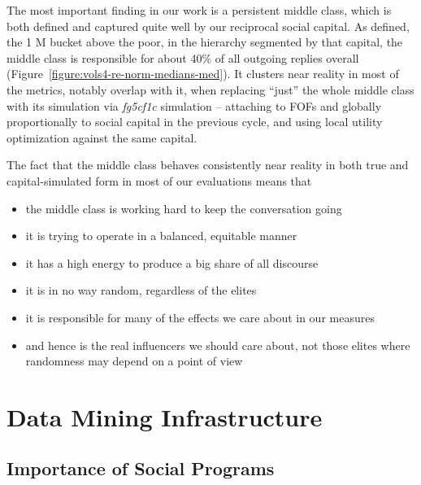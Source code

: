 \documentclass[10pt,oneside]{memoir}
\begin{document}
\begin{Spacing}{2}
The most important finding in our work is a persistent middle class, which is both defined and captured quite well by our reciprocal social capital.  As defined, the 1 M bucket above the poor, in the hierarchy segmented by that capital, the middle class is responsible for about 40\% of all outgoing replies overall (Figure~\ref{figure:vols4-re-norm-medians-med}).  It clusters near reality in most of the metrics, notably overlap with it, when replacing ``just'' the whole middle class with its simulation via {\itshape fg5cf1c} simulation -- attaching to FOFs and globally proportionally to social capital in the previous cycle, and using local utility optimization against the same capital.  


The fact that the middle class behaves consistently near reality in both true and capital-simulated form in most of our evaluations means that


\begin{itemize}


\item the middle class is working hard to keep the conversation going

\item it is trying to operate in a balanced, equitable manner

\item it has a high energy to produce a big share of all discourse

\item it is in no way random, regardless of the elites

\item it is responsible for many of the effects we care about in our measures

\item and hence is the real influencers we should care about, not those elites where randomness may depend on a point of view
\end{itemize}

\pagebreak \chapter{Data Mining Infrastructure}
\label{datamininginfrastructure}

\label{chapter:datamining-infrastructure}


\section{Importance of Social Programs}
\label{importanceofsocialprograms}


\end{Spacing}
\end{document}
